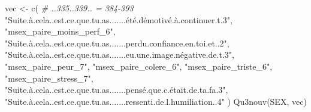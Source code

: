 \documentclass[
]{article}
\newenvironment{Shaded}{\begin{snugshade}}{\end{snugshade}}
\newcommand{\CommentTok}[1]{\textcolor[rgb]{0.56,0.35,0.01}{\textit{#1}}}
\newcommand{\FunctionTok}[1]{\textcolor[rgb]{0.00,0.00,0.00}{#1}}
\newcommand{\NormalTok}[1]{#1}
\newcommand{\OtherTok}[1]{\textcolor[rgb]{0.56,0.35,0.01}{#1}}
\newcommand{\StringTok}[1]{\textcolor[rgb]{0.31,0.60,0.02}{#1}}
\begin{document}
\begin{Shaded}
\begin{Highlighting}[]
\NormalTok{vec }\OtherTok{\textless{}{-}} \FunctionTok{c}\NormalTok{(  }\CommentTok{\# ..335..339.. = 384{-}393}
    \StringTok{"Suite.à.cela..est.ce.que.tu.as.......été.démotivé.à.continuer.t.3"}\NormalTok{,}
    \StringTok{"msex\_paire\_moins\_perf\_6"}\NormalTok{,}
    \StringTok{"Suite.à.cela..est.ce.que.tu.as.......perdu.confiance.en.toi.et..2"}\NormalTok{,}
    \StringTok{"Suite.à.cela..est.ce.que.tu.as.......eu.une.image.négative.de.t.3"}\NormalTok{,}
    \StringTok{"msex\_paire\_peur\_7"}\NormalTok{,}
    \StringTok{"msex\_paire\_colere\_6"}\NormalTok{,}
    \StringTok{"msex\_paire\_triste\_6"}\NormalTok{,}
    \StringTok{"msex\_paire\_stress\_7"}\NormalTok{,}
    \StringTok{"Suite.à.cela..est.ce.que.tu.as.......pensé.que.c.était.de.ta.fa.3"}\NormalTok{,}
    \StringTok{"Suite.à.cela..est.ce.que.tu.as.......ressenti.de.l.humiliation..4"}
\NormalTok{  )}
\FunctionTok{Qu3nouv}\NormalTok{(SEX, vec)}
\end{Highlighting}
\end{Shaded}
\end{document}
